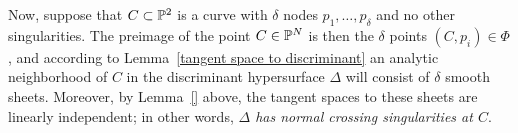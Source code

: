 Now, suppose that $C \subset {\mathbb P}^2$ is a curve with $\delta$ nodes $p_1,\dots,p_\delta$ and no other singularities. The preimage of the point $C \in {\mathbb P}^N$ is then the $\delta$ points $(C,p_i) \in \Phi$, and according to  Lemma~\ref{tangent space to discriminant} an analytic neighborhood of $C$ in the discriminant hypersurface $\Delta$ will consist of $\delta$ smooth sheets. Moreover, by Lemma~\ref{} above, the tangent spaces to these sheets are linearly independent; in other words, \emph{$\Delta$ has normal crossing singularities at $C$}.


%
%
%
%
%

